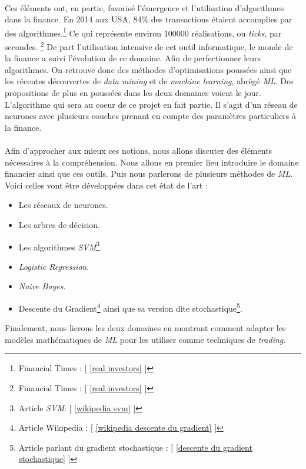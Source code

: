 \documentclass[a4paper, 11pt]{article}
\begin{document}
\paragraph{}
Ces éléments ont, en partie, favorisé l'émergence et l'utilisation d'algorithmes dans la finance. En 2014 aux USA, 84\% des transactions étaient accomplies par des algorithmes.\footnote{Financial Times : $[$ \ref{real investors} $]$} Ce qui représente environ 100000 réalisations, ou \textit{ticks}, par secondes. \footnote{Financial Times : $[$ \ref{real investors} $]$}
De part l'utilisation intensive de cet outil informatique, le monde de la finance a suivi l'évolution de ce domaine. Afin de perfectionner leurs algorithmes.
On retrouve donc des méthodes d'optimisations poussées ainsi que les récentes découvertes de \textit{data mining} et de \textit{machine learning}, abrégé \textit{ML}. Des propositions de plus en poussées dans les deux domaines voient le jour. L'algorithme qui sera au coeur de ce projet en fait partie. Il s'agit d'un réseau de neurones avec plusieurs couches prenant en compte des paramètres particuliers à la finance.

\paragraph{}Afin d'approcher aux mieux ces notions, nous allons discuter des éléments nécessaires à la compréhension.
Nous allons en premier lieu introduire le domaine financier ainsi que ces outils. Puis nous parlerons de plusieurs méthodes de \textit{ML}.
Voici celles vont être développées dans cet état de l'art :
\begin{itemize}
\item Les réseaux de neurones.
\item Les arbres de décision.
\item Les algorithmes \textit{SVM}\footnote{ Article \textit{SVM}: $[$ \ref{wikipedia svm} $]$}.
\item \textit{Logistic Regression}.
\item \textit{Naive Bayes}.
\item Descente du Gradient\footnote{Article Wikipedia : $[$ \ref{wikipedia descente du gradient} $]$} ainsi que sa version dite stochastique\footnote{Article parlant du gradient stochastique : $[$ \ref{descente du gradient stochastique} $]$}.
\end{itemize}

Finalement, nous lierons les deux domaines en montrant comment adapter les modèles mathématiques de \textit{ML} pour les utiliser comme techniques de \textit{trading}.
\end{document}
